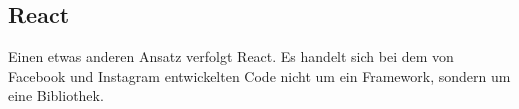 \subsection{React}
\label{sec:react}

Einen etwas anderen Ansatz verfolgt React. Es handelt sich bei dem von Facebook und Instagram entwickelten Code nicht um ein Framework, sondern um eine Bibliothek. 



